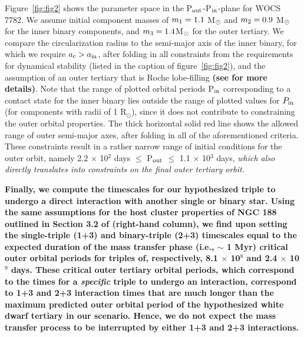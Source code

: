 \documentclass[twocolumn]{aastex62}
\def\simon#1{{\bf {\color{red}[#1 -- Simon]}}}
\begin{document}
Figure~\ref{fig:fig2} shows the parameter space in the P$_{\rm
  out}$-P$_{\rm in}$-plane for WOCS 7782.  We assume initial
component masses of $m_{\rm 1} = 1.1$ M$_{\rm \odot}$ and $m_{\rm 2} =
0.9$ M$_{\rm \odot}$ for the inner binary components, and $m_{\rm 3} =
1.4 $M$_{\rm \odot}$ for the outer tertiary.  We compare the
circularization radius to the semi-major axis of the inner binary, for
which we require $a_{\rm c} > a_{\rm in}$, after folding in all
constraints from the requirements for dynamical stability (listed in
the caption of figure~\ref{fig:fig2}), and the assumption of an outer tertiary that is Roche
lobe-filling \textbf{(see \citet{2014MNRAS.438.1909D} for more details)}.  
Note that the range of
plotted orbital periods P$_{\rm in}$ corresponding to a contact state
for the inner binary lies outside the range of plotted values for
$P_{\rm in}$ (for components with radii of 1 R$_{\odot}$),
since it does not contribute to constraining the outer orbital
properties.  The thick horizontal solid red line shows the allowed
range of outer semi-major axes, after folding in all of 
the aforementioned criteria.  These constraints result in a rather narrow
range of initial conditions for the outer orbit, namely 2.2 $\times$
10$^{2}$ days $\le$ P$_{\rm out}$ $\le$ 1.1 $\times$ 10$^3$ days, \textit{which also directly translates into constraints on the final outer tertiary orbit.}

\textbf{Finally, we compute the timescales for our hypothesized triple to undergo a direct interaction with another single or binary star.  Using the same assumptions for the host cluster properties of NGC 188 outlined in Section 3.2 of \citet{2011MNRAS.410.2370L} (right-hand column), we find upon setting the single-triple (1+3) and binary-triple (2+3) timescales equal to the expected duration of the mass transfer phase (i.e., $\sim$ 1 Myr) critical outer orbital periods for triples of, respectively, 8.1 $\times$ 10$^8$ and 2.4 $\times$ 10$^9$ days.  These critical outer tertiary orbital periods, which correspond to the times for a \textit{specific} triple to undergo an interaction, correspond to 1+3 and 2+3 interaction times that are much longer than the maximum predicted outer orbital period of the hypothesized white dwarf tertiary in our scenario.  Hence, we do not expect the mass transfer process to be interrupted by either 1+3 and 2+3 interactions.}
\end{document}
